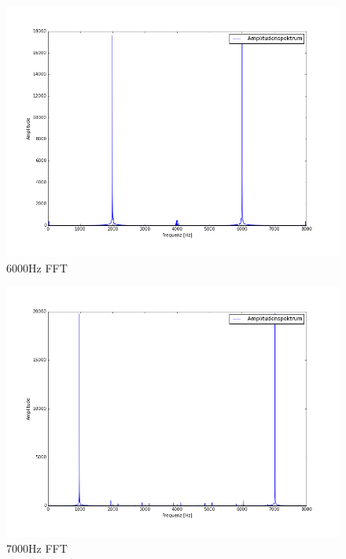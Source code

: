 \documentclass[12pt,oneside,a4paper]{report}
\begin{document}
\begin{figure}[H]
\centering\small
\includegraphics[scale=0.4]{src/6000fft.png}
\caption{6000Hz FFT}
\label{fig:6000_FFT}
\end{figure}

\begin{figure}[H]
\centering\small
\includegraphics[scale=0.4]{src/7000fft.png}
\caption{7000Hz FFT}
\label{fig:7000_FFT}
\end{figure}
\end{document}
